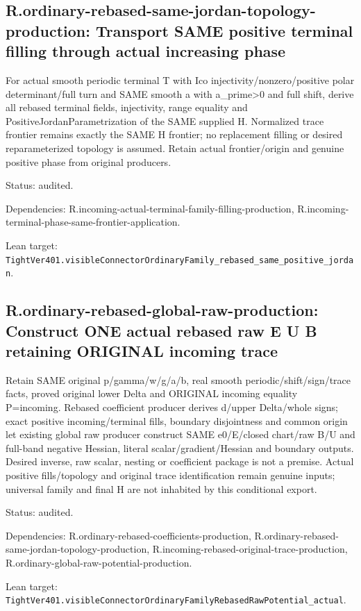 \documentclass{article}
\begin{document}
\subsection*{R.ordinary-rebased-same-jordan-topology-production: Transport SAME positive terminal filling through actual increasing phase}
For actual smooth periodic terminal T with Ico injectivity/nonzero/positive polar determinant/full turn and SAME smooth a with a\_prime>0 and full shift, derive all rebased terminal fields, injectivity, range equality and PositiveJordanParametrization of the SAME supplied H. Normalized trace frontier remains exactly the SAME H frontier; no replacement filling or desired reparameterized topology is assumed. Retain actual frontier/origin and genuine positive phase from original producers.
\par Status: audited.
\par Dependencies: R.incoming-actual-terminal-family-filling-production, R.incoming-terminal-phase-same-frontier-application.
\par Lean target: \texttt{TightVer401.visibleConnectorOrdinaryFamily\_rebased\_same\_positive\_jordan}.
\subsection*{R.ordinary-rebased-global-raw-production: Construct ONE actual rebased raw E U B retaining ORIGINAL incoming trace}
Retain SAME original p/gamma/w/g/a/b, real smooth periodic/shift/sign/trace facts, proved original lower Delta and ORIGINAL incoming equality P=incoming. Rebased coefficient producer derives d/upper Delta/whole signs; exact positive incoming/terminal fills, boundary disjointness and common origin let existing global raw producer construct SAME e0/E/closed chart/raw B/U and full-band negative Hessian, literal scalar/gradient/Hessian and boundary outputs. Desired inverse, raw scalar, nesting or coefficient package is not a premise. Actual positive fills/topology and original trace identification remain genuine inputs; universal family and final H are not inhabited by this conditional export.
\par Status: audited.
\par Dependencies: R.ordinary-rebased-coefficients-production, R.ordinary-rebased-same-jordan-topology-production, R.incoming-rebased-original-trace-production, R.ordinary-global-raw-potential-production.
\par Lean target: \texttt{TightVer401.visibleConnectorOrdinaryFamilyRebasedRawPotential\_actual}.
\end{document}
